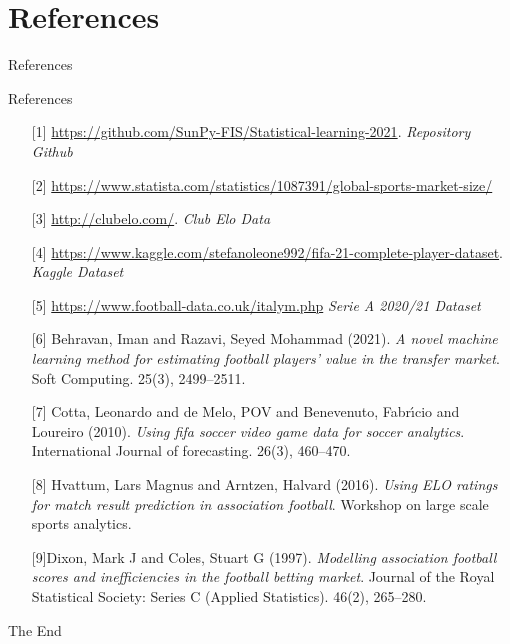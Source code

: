 \documentclass[aspectratio=169,xcolor=dvipsnames]{beamer}
\begin{document}

\section{References}

\begin{frame}{}
    \begin{Huge}
    \begin{center}
     References
    \end{center}
    \end{Huge}
\end{frame}

\begin{frame}{References}
\footnotesize{
\begin{itemize}
    \item[] [1] \url{https://github.com/SunPy-FIS/Statistical-learning-2021}. \textit{Repository Github}
    \item[] [2] \url{https://www.statista.com/statistics/1087391/global-sports-market-size/}
    \item[] [3] \url{http://clubelo.com/}. \textit{Club Elo Data}
    \item[] [4] \url{https://www.kaggle.com/stefanoleone992/fifa-21-complete-player-dataset}. \textit{Kaggle Dataset}
    \item[] [5] \url{https://www.football-data.co.uk/italym.php} \textit{Serie A 2020/21 Dataset}
    \item[] [6] Behravan, Iman and Razavi, Seyed Mohammad (2021). \textit{A novel machine learning method for estimating football players’ value in the transfer market}. Soft Computing. 25(3), 2499--2511.
    \item[] [7] Cotta, Leonardo and de Melo, POV and Benevenuto, Fabr{\'\i}cio and Loureiro (2010). \textit{Using fifa soccer video game data for soccer analytics}. International Journal of forecasting. 26(3), 460--470.
    \item[] [8] Hvattum, Lars Magnus and Arntzen, Halvard (2016). \textit{Using ELO ratings for match result prediction in association football}. Workshop on large scale sports analytics.
    \item[] [9]Dixon, Mark J and Coles, Stuart G (1997). \textit{Modelling association football scores and inefficiencies in the football betting market}. Journal of the Royal Statistical Society: Series C (Applied Statistics). 46(2), 265--280.
\end{itemize}
}
\end{frame}


\begin{frame}
    \Huge{\centerline{The End}}
\end{frame}

\end{document}
